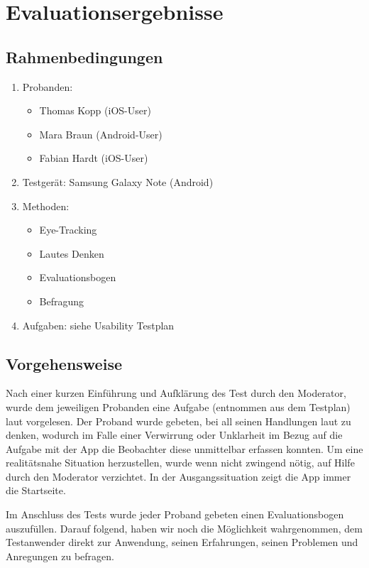 \section{Evaluationsergebnisse}

\subsection*{Rahmenbedingungen}
\begin{enumerate}
\item Probanden:
  \begin{itemize}
  \item Thomas Kopp (iOS-User)
  \item Mara Braun (Android-User)
  \item Fabian Hardt (iOS-User)
  \end{itemize}
\item Testgerät: Samsung Galaxy Note (Android)
\item Methoden:
  \begin{itemize}
  \item Eye-Tracking
  \item Lautes Denken
  \item Evaluationsbogen
  \item Befragung
  \end{itemize}
\item Aufgaben: siehe Usability Testplan
\end{enumerate}

\subsection*{Vorgehensweise}

Nach einer kurzen Einführung und Aufklärung des Test durch den Moderator, wurde
dem jeweiligen Probanden eine Aufgabe (entnommen aus dem Testplan) laut
vorgelesen. Der Proband wurde gebeten, bei all seinen Handlungen laut zu denken,
wodurch im Falle einer Verwirrung oder Unklarheit im Bezug auf die Aufgabe mit
der App die Beobachter diese unmittelbar erfassen konnten. Um eine realitätsnahe
Situation herzustellen, wurde wenn nicht zwingend nötig, auf Hilfe durch den
Moderator verzichtet. In der Ausgangssituation zeigt die App immer die
Startseite.

Im Anschluss des Tests wurde jeder Proband gebeten einen Evaluationsbogen
auszufüllen. Darauf folgend, haben wir noch die Möglichkeit wahrgenommen, dem
Testanwender direkt zur Anwendung, seinen Erfahrungen, seinen Problemen und
Anregungen zu befragen.

